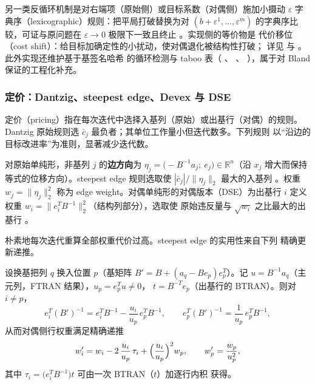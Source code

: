 \begin{remark}[摄动与移位]\label{rem:thlp-perturbation}
另一类反循环机制是对右端项（原始侧）或目标系数（对偶侧）施加小摄动
$\varepsilon$ 字典序（lexicographic）规则：把平局打破替换为对
$(b+\varepsilon^1,\dots,\varepsilon^m)$ 的字典序比较，可证与原问题在
$\varepsilon\to0$ 极限下一致且终止 \cite{lpchvatal1983}。实现侧的等价物是
代价移位（cost shift）：给目标加确定性的小扰动，使对偶退化被结构性打破；
详见  与
。此外实现还维护基于基签名哈希
的循环检测与 taboo 表（
、
、
），属于对 Bland 保证的工程化补充。
\end{remark}

\subsubsection{定价：Dantzig、steepest edge、Devex 与 DSE}\label{subsubsec:thlp-pricing}

定价（pricing）指在每次迭代中选择入基列（原始）或出基行（对偶）的规则。
Dantzig 原始规则选 $\bar c_j$ 最负者；其单位工作量小但迭代数多。下列规则
以``沿边的目标改进率''为准则，显著减少迭代数。

\begin{definition}\label{def:thlp-se}
对原始单纯形，非基列 $j$ 的\textbf{边方向}为
$\eta_j=\bigl(-B^{-1}a_j;\ e_j\bigr)\in\mathbb{R}^{n}$（沿 $x_j$ 增大而保持
等式的位移方向）。steepest edge 规则选取使
$|\bar c_j|/\|\eta_j\|_2$ 最大的入基列 \cite{lpgoldfarb1977}。权重
$w_j=\|\eta_j\|_2^2$ 称为 edge weight。对偶单纯形的对偶版本（DSE）为出基行
$i$ 定义权重 $w_i=\|e_i^{T}B^{-1}\|_2^2$（结构列部分），选取使
原始违反量与 $\sqrt{w_i}$ 之比最大的出基行
\cite{lpforrest1992}。
\end{definition}

朴素地每次迭代重算全部权重代价过高。steepest edge 的实用性来自下列
精确更新递推。

\begin{theorem}\label{thm:thlp-se-update}
设换基把列 $q$ 换入位置 $p$（基矩阵 $B'=B+(a_q-Be_p)e_p^{T}$）。记
$u=B^{-1}a_q$（主元列，FTRAN 结果），$u_p=e_p^{T}u\ne0$，
$t=B^{-T}e_p$（出基行的 BTRAN）。则对 $i\ne p$，
\begin{equation}\label{eq:thlp-se-rowupdate}
  e_i^{T}(B')^{-1}
  =e_i^{T}B^{-1}-\frac{u_i}{u_p}\,e_p^{T}B^{-1},
  \qquad
  e_p^{T}(B')^{-1}=\frac{1}{u_p}\,e_p^{T}B^{-1},
\end{equation}
从而对偶侧行权重满足精确递推
\begin{equation}\label{eq:thlp-se-wupdate}
  w_i'=w_i-2\,\frac{u_i}{u_p}\,\tau_i+\Bigl(\frac{u_i}{u_p}\Bigr)^{2}w_p,
  \qquad
  w_p'=\frac{w_p}{u_p^{2}},
\end{equation}
其中 $\tau_i=\bigl(e_i^{T}B^{-1}\bigr)t$ 可由一次 BTRAN（$t$）加逐行内积
获得。
\end{theorem}


